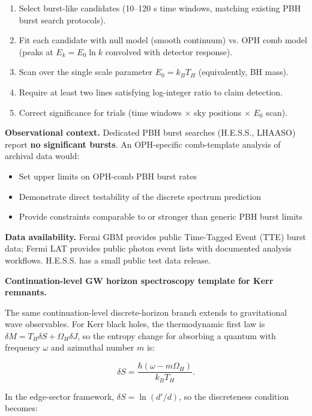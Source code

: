 \begin{enumerate}
\def\labelenumi{\arabic{enumi}.}
\tightlist
\item
  Select burst-like candidates (10--120 s time windows, matching existing PBH burst search protocols).
\item
  Fit each candidate with null model (smooth continuum) vs. OPH comb model (peaks at \(E_k = E_0 \ln k\) convolved with detector response).
\item
  Scan over the single scale parameter \(E_0 = k_B T_H\) (equivalently, BH mass).
\item
  Require at least two lines satisfying log-integer ratio to claim detection.
\item
  Correct significance for trials (time windows \(\times\) sky positions \(\times\) \(E_0\) scan).
\end{enumerate}

\textbf{Observational context.} Dedicated PBH burst searches (H.E.S.S., LHAASO) report \textbf{no significant bursts}. An OPH-specific comb-template analysis of archival data would:

\begin{itemize}
\tightlist
\item
  Set upper limits on OPH-comb PBH burst rates
\item
  Demonstrate direct testability of the discrete spectrum prediction
\item
  Provide constraints comparable to or stronger than generic PBH burst limits
\end{itemize}

\textbf{Data availability.} Fermi GBM provides public Time-Tagged Event (TTE) burst data; Fermi LAT provides public photon event lists with documented analysis workflows. H.E.S.S. has a small public test data release.

\textbf{Continuation-level GW horizon spectroscopy template for Kerr remnants.}

The same continuation-level discrete-horizon branch extends to gravitational wave observables. For Kerr black holes, the thermodynamic first law is \(\delta M = T_H \delta S +
\Omega_H \delta J\), so the entropy change for absorbing a quantum with frequency \(\omega\) and azimuthal number \(m\) is:

\[
\delta S = \frac{\hbar(\omega - m\Omega_H)}{k_B T_H}.
\]

In the edge-sector framework, \(\delta S = \ln(d'/d)\), so the discreteness condition becomes:

